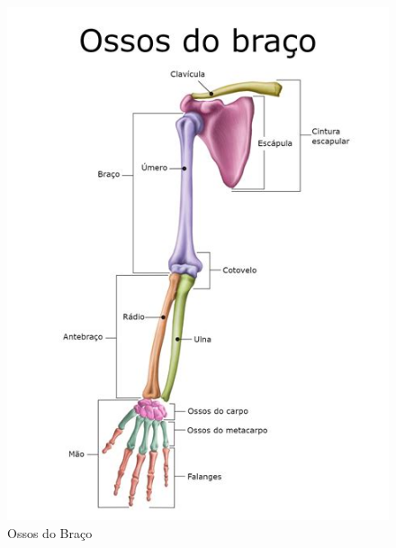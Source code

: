 \documentclass[
]{book}
\begin{document}
\begin{figure}

{\centering \includegraphics[width=0.9\linewidth]{figuras/Aula4-1-Ossos-do-braco} 

}

\caption{Ossos do Braço}\label{fig:unnamed-chunk-4}
\end{figure}
\end{document}
